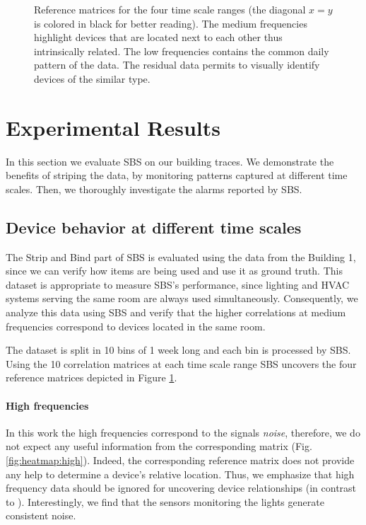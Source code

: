 \begin{figure}[t!]
\caption{Reference matrices for the four time scale ranges (the diagonal $x=y$ is colored in black for better reading). The medium frequencies highlight devices that are located next to each other thus intrinsically related. The low frequencies contains the common daily pattern of the data. The residual data permits to visually identify devices of the similar type.}
\label{fig:heatmap}
\end{figure}

\section{Experimental Results}
In this section we evaluate SBS on our building traces.  We demonstrate
 the benefits of striping the data, by monitoring patterns captured at different time scales.
Then, we thoroughly investigate the alarms reported by SBS.

\subsection{Device behavior at different time scales}
The Strip and Bind part of SBS is evaluated using the data from the Building 1, since we can verify how items are being 
used and use it as ground truth.
This dataset is appropriate to measure SBS's performance, since lighting and HVAC systems serving the same room are always used 
simultaneously.
Consequently, we analyze this data using SBS and verify that the higher correlations at medium frequencies correspond to devices located in the same room. %

The dataset is split in 10 bins of 1 week long and each bin is processed by SBS.
Using the 10 correlation matrices at each time scale range SBS uncovers the four reference matrices depicted in 
Figure \ref{fig:heatmap}.

\paragraph{High frequencies}
In this work the high frequencies correspond to the signals \emph{noise}, 
therefore, we do not expect any useful information from the corresponding matrix (Fig. \ref{fig:heatmap:high}).
Indeed, the corresponding reference matrix does not provide any help to determine a device's relative location.
Thus, we emphasize that high frequency data should be ignored for uncovering device relationships (in contrast to \cite{romain:iotapp12}).
Interestingly, we find that the sensors monitoring the lights generate consistent noise. %
  
